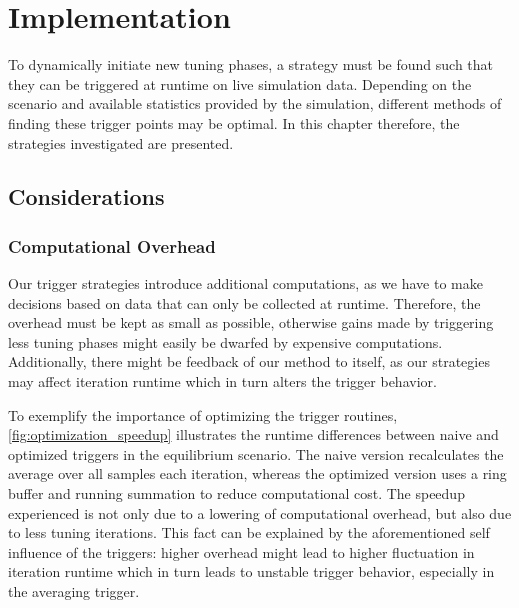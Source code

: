 \chapter[Implementation]{Implementation}
\label{cp:implementation}

{
	\parindent0pt
	To dynamically initiate new tuning phases, a strategy must be found such that they can be triggered at runtime on live simulation data. Depending on the scenario and available statistics provided by the simulation, different methods of finding these trigger points may be optimal. In this chapter therefore, the strategies investigated are presented.
}

\section{Considerations}
\subsection{Computational Overhead}
Our trigger strategies introduce additional computations, as we have to make decisions based on data that can only be collected at runtime. Therefore, the overhead must be kept as small as possible, otherwise gains made by triggering less tuning phases might easily be dwarfed by expensive computations. Additionally, there might be feedback of our method to itself, as our strategies may affect iteration runtime which in turn alters the trigger behavior.

To exemplify the importance of optimizing the trigger routines, \autoref{fig:optimization_speedup} illustrates the runtime differences between naive and optimized triggers in the equilibrium scenario. The naive version recalculates the average over all samples each iteration, whereas the optimized version uses a ring buffer and running summation to reduce computational cost.
The speedup experienced is not only due to a lowering of computational overhead, but also due to less tuning iterations. This fact can be explained by the aforementioned self influence of the triggers: higher overhead might lead to higher fluctuation in iteration runtime which in turn leads to unstable trigger behavior, especially in the averaging trigger.


